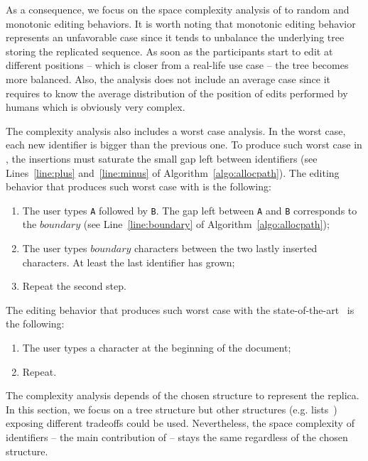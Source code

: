 \noindent As a consequence, we focus on the space complexity analysis of \LSEQ
to random and monotonic editing behaviors. It is worth noting that monotonic
editing behavior represents an unfavorable case since it tends to unbalance the
underlying tree storing the replicated sequence. As soon as the participants
start to edit at different positions -- which is closer from a real-life use
case -- the tree becomes more balanced.
Also, the analysis does not include an average case since it requires to know
the average distribution of the position of edits performed by humans which is
obviously very complex.

\noindent The complexity analysis also includes a worst case analysis. In the
worst case, each new identifier is bigger than the previous one. To produce such
worst case in \LSEQ, the insertions must saturate the small gap left between
identifiers (see Lines~\ref{line:plus} and~\ref{line:minus} of
Algorithm~\ref{algo:allocpath}). The editing behavior that produces such worst
case with \LSEQ is the following:
\begin{enumerate}[noitemsep]
\item The user types \texttt{A} followed by \texttt{B}. The gap left between
  \texttt{A} and \texttt{B} corresponds to the $boundary$ (see
  Line~\ref{line:boundary} of Algorithm~\ref{algo:allocpath});
\item The user types $boundary$ characters between the two lastly inserted
  characters. At least the last identifier has grown;
\item Repeat the second step.
\end{enumerate}
The editing behavior that produces such worst case with the
state-of-the-art~\cite{preguica2009commutative, weiss2009logoot} is the
following:
\begin{enumerate}[noitemsep]
\item The user types a character at the beginning of the document;
\item Repeat.
\end{enumerate}



The complexity analysis depends of the chosen structure to represent the
replica. In this section, we focus on a tree structure but other structures
(e.g. lists~\cite{weiss2009logoot}) exposing different tradeoffs could be
used. Nevertheless, the space complexity of identifiers -- the main contribution
of \LSEQ -- stays the same regardless of the chosen structure.


